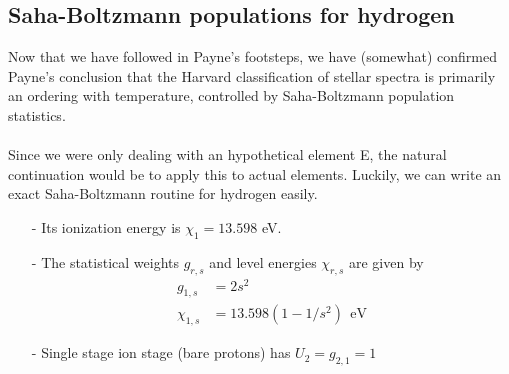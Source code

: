 \documentclass{article}
\begin{document}
\subsection{Saha-Boltzmann populations for hydrogen}
Now that we have followed in Payne's footsteps, we have (somewhat) confirmed Payne's conclusion that the Harvard classification of stellar spectra is primarily an ordering with temperature, controlled by Saha-Boltzmann population statistics.\\\\
Since we were only dealing with an hypothetical element E, the natural continuation would be to apply this to actual elements. Luckily, we can write an exact Saha-Boltzmann routine for hydrogen easily.
\begin{itemize}
  \item[-]Its ionization energy is $\chi_1 = 13.598$ eV.
  \item[-]The statistical weights $g_{r,s}$ and level energies $\chi_{r,s}$ are given by
    \begin{align*}
      g_{1,s} &= 2s^2\\
      \chi_{1,s} &= 13.598(1-1/s^2)\;\,\text{eV}
    \end{align*}
  \item[-]Single stage ion stage (bare protons) has $U_2 = g_{2,1} = 1$
\end{itemize}
\end{document}
